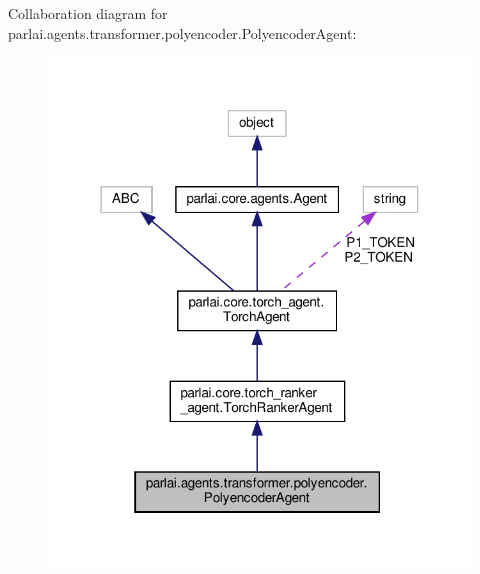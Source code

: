 Collaboration diagram for parlai.\+agents.\+transformer.\+polyencoder.\+Polyencoder\+Agent\+:
\nopagebreak
\begin{figure}[H]
\begin{center}
\leavevmode
\includegraphics[width=318pt]{classparlai_1_1agents_1_1transformer_1_1polyencoder_1_1PolyencoderAgent__coll__graph}
\end{center}
\end{figure}
